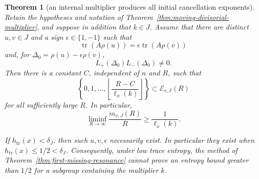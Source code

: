 \documentclass[11pt,reqno]{amsart}
\newtheorem{theorem}{Theorem}[section]
\theoremstyle{definition}
\theoremstyle{remark}
\newcommand{\Tr}{\operatorname{tr}}
\begin{document}
\begin{theorem}[an internal multiplier produces all initial cancellation exponents]
\label{thm:internal-multiplier-resonance}
Retain the hypotheses and notation of
Theorem~\ref{thm:moving-divisorial-multiplier}, and suppose in addition
that \(k\in J\).  Assume that there are distinct \(u,v\in J\) and a sign
\(\epsilon\in\{1,-1\}\) such that
\[
 \Tr(A\rho(u))=\epsilon\Tr(A\rho(v))
\]
and, for \(\Delta_0=\rho(u)-\epsilon\rho(v)\),
\[
 L_+(\Delta_0)L_-(\Delta_0)\ne0.
\]
Then there is a constant \(C\), independent of \(n\) and \(R\), such that
\[
 \left\{0,1,\ldots,
 \left\lfloor\frac{R-C}{\ell_x(k)}\right\rfloor\right\}
 \subset \mathcal E_{v,J}(R)
\tag{13.10ab}
\]
for all sufficiently large \(R\).  In particular,
\[
 \liminf_{R\to\infty}\frac{m_{v,J}(R)}R
 \ge\frac1{\ell_x(k)}.
\tag{13.10ac}
\]

If \(h_{\Tr}(x)<\delta_J\), then such \(u,v,\epsilon\) necessarily
exist.  In particular they exist when
\(h_{\Tr}(x)\le1/2<\delta_J\).  Consequently, under low trace entropy,
the method of Theorem~\ref{thm:first-missing-resonance} cannot prove an
entropy bound greater than \(1/2\) for a subgroup containing the multiplier
\(k\).
\end{theorem}
\end{document}
